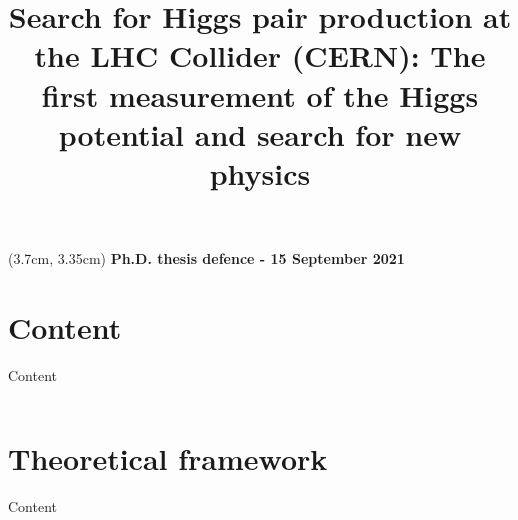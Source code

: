 \documentclass[10pt,aspectratio=169]{beamer}
\title{\Large\textcolor{HHwhite2}{Search for Higgs pair production at the LHC Collider (CERN): The first measurement of the Higgs potential and search for new physics}}
\author{ 
\textcolor{HHwhite2}{
{\and} \\
{\Large\textbf{Mohamed BELFKIR}} \\
{\and} \\
{\textit{Supervised by}} \\
{\large\textsf{St\'ephane JEZEQUEL}}
}
}
\date{}
\begin{document}
{
\begin{frame}
\begin{textblock*}{10cm}(3.7cm, 3.35cm) %
   \textbf{\large\textcolor{HHwhite2}{Ph.D. thesis defence - 15 September 2021}}
\end{textblock*}
\titlepage
\end{frame}
}

\section*{Content}
\begin{frame}{Content}
\label{content}
    \begin{columns}[t]
        \begin{column}{.5\textwidth}
            \tableofcontents[sections={1-5}]
        \end{column}
        \begin{column}{.5\textwidth}
            \tableofcontents[sections={6-}]
        \end{column}
    \end{columns}
\end{frame}

\section{Theoretical framework}
\begin{frame}{Content}
\label{content}
    \begin{columns}[t]
        \begin{column}{.5\textwidth}
            \tableofcontents[sections={1-5},currentsection]
        \end{column}
        \begin{column}{.5\textwidth}
            \tableofcontents[sections={6-},currentsection]
        \end{column}
    \end{columns}
\end{frame}

\end{document}
